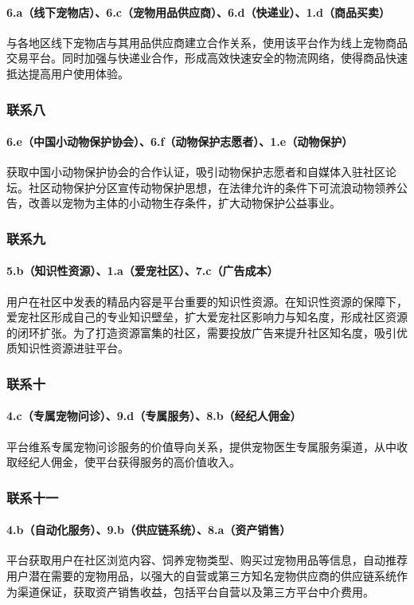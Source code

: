 \documentclass[a4paper]{ctexart}
\begin{document}
\paragraph{6.a（线下宠物店）、6.c（宠物用品供应商）、6.d（快递业）、1.d（商品买卖）}与各地区线下宠物店与其用品供应商建立合作关系，使用该平台作为线上宠物商品交易平台。同时加强与快递业合作，形成高效快速安全的物流网络，使得商品快速抵达提高用户使用体验。
\subsubsection{联系八}
\paragraph{6.e（中国小动物保护协会）、6.f（动物保护志愿者）、1.e（动物保护）}获取中国小动物保护协会的合作认证，吸引动物保护志愿者和自媒体入驻社区论坛。社区动物保护分区宣传动物保护思想，在法律允许的条件下可流浪动物领养公告，改善以宠物为主体的小动物生存条件，扩大动物保护公益事业。
\subsubsection{联系九}
\paragraph{5.b（知识性资源）、1.a（爱宠社区）、7.c（广告成本）}用户在社区中发表的精品内容是平台重要的知识性资源。在知识性资源的保障下，爱宠社区形成自己的专业知识壁垒，扩大爱宠社区影响力与知名度，形成社区资源的闭环扩张。为了打造资源富集的社区，需要投放广告来提升社区知名度，吸引优质知识性资源进驻平台。
\subsubsection{联系十}
\paragraph{4.c（专属宠物问诊）、9.d（专属服务）、8.b（经纪人佣金）}平台维系专属宠物问诊服务的价值导向关系，提供宠物医生专属服务渠道，从中收取经纪人佣金，使平台获得服务的高价值收入。
\subsubsection{联系十一}
\paragraph{4.b（自动化服务）、9.b（供应链系统）、8.a（资产销售）}平台获取用户在社区浏览内容、饲养宠物类型、购买过宠物用品等信息，自动推荐用户潜在需要的宠物用品，以强大的自营或第三方知名宠物供应商的供应链系统作为渠道保证，获取资产销售收益，包括平台自营以及第三方平台中介费用。
\end{document}
